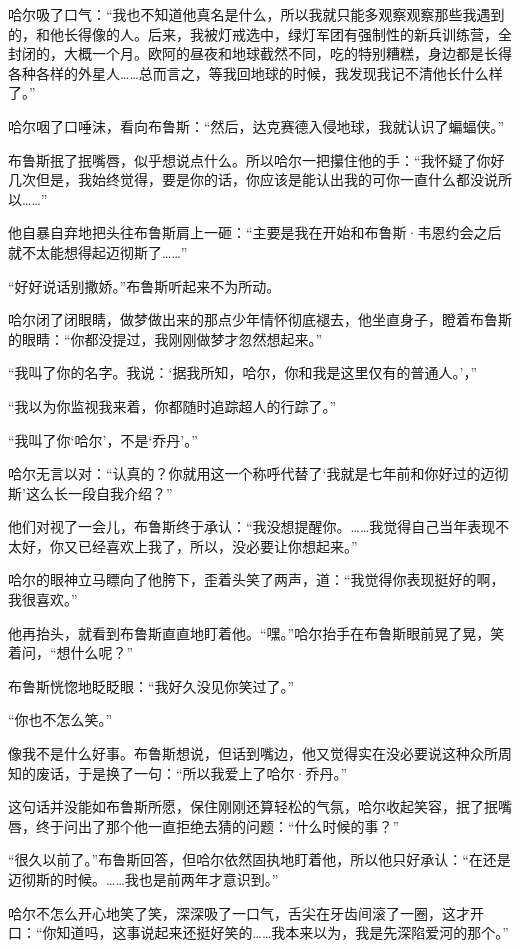 \documentclass[../main]{subfiles}
\begin{document}
哈尔吸了口气：“我也不知道他真名是什么，所以我就只能多观察观察那些我遇到的，和他长得像的人。后来，我被灯戒选中，绿灯军团有强制性的新兵训练营，全封闭的，大概一个月。欧阿的昼夜和地球截然不同，吃的特别糟糕，身边都是长得各种各样的外星人……总而言之，等我回地球的时候，我发现我记不清他长什么样了。”

哈尔咽了口唾沫，看向布鲁斯：“然后，达克赛德入侵地球，我就认识了蝙蝠侠。”

布鲁斯抿了抿嘴唇，似乎想说点什么。所以哈尔一把攥住他的手：“我怀疑了你好几次但是，我始终觉得，要是你的话，你应该是能认出我的可你一直什么都没说所以……”

他自暴自弃地把头往布鲁斯肩上一砸：“主要是我在开始和布鲁斯·韦恩约会之后就不太能想得起迈彻斯了……”

“好好说话别撒娇。”布鲁斯听起来不为所动。

哈尔闭了闭眼睛，做梦做出来的那点少年情怀彻底褪去，他坐直身子，瞪着布鲁斯的眼睛：“你都没提过，我刚刚做梦才忽然想起来。”

“我叫了你的名字。我说：‘据我所知，哈尔，你和我是这里仅有的普通人。’，”

“我以为你监视我来着，你都随时追踪超人的行踪了。”

“我叫了你‘哈尔’，不是‘乔丹’。”

哈尔无言以对：“认真的？你就用这一个称呼代替了‘我就是七年前和你好过的迈彻斯’这么长一段自我介绍？”

他们对视了一会儿，布鲁斯终于承认：“我没想提醒你。……我觉得自己当年表现不太好，你又已经喜欢上我了，所以，没必要让你想起来。”

哈尔的眼神立马瞟向了他胯下，歪着头笑了两声，道：“我觉得你表现挺好的啊，我很喜欢。”

他再抬头，就看到布鲁斯直直地盯着他。“嘿。”哈尔抬手在布鲁斯眼前晃了晃，笑着问，“想什么呢？”

布鲁斯恍惚地眨眨眼：“我好久没见你笑过了。”

“你也不怎么笑。”

像我不是什么好事。布鲁斯想说，但话到嘴边，他又觉得实在没必要说这种众所周知的废话，于是换了一句：“所以我爱上了哈尔·乔丹。”

这句话并没能如布鲁斯所愿，保住刚刚还算轻松的气氛，哈尔收起笑容，抿了抿嘴唇，终于问出了那个他一直拒绝去猜的问题：“什么时候的事？”

“很久以前了。”布鲁斯回答，但哈尔依然固执地盯着他，所以他只好承认：“在还是迈彻斯的时候。……我也是前两年才意识到。”

哈尔不怎么开心地笑了笑，深深吸了一口气，舌尖在牙齿间滚了一圈，这才开口：“你知道吗，这事说起来还挺好笑的……我本来以为，我是先深陷爱河的那个。”
\end{document}
